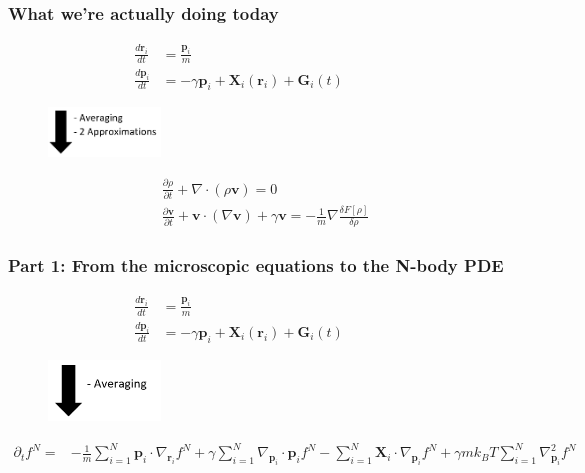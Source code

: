 \documentclass[aspectratio=169,xcolor=dvipsnames]{beamer}
\begin{document}
\begin{frame}
	\frametitle{What we're actually doing today}
	
	\begin{align*}
	\frac{d \mathbf{r}_i}{dt} &= \frac{\mathbf{p}_i}{m}\\
	\frac{d \mathbf{p}_i}{dt} &= - \gamma \mathbf{p}_i + \mathbf{X}_i(\mathbf{r}_i) + \mathbf{G}_i(t) \qquad \quad
	\end{align*}
	\vspace{-0.5cm}
	\begin{figure}
		\includegraphics[width=3cm]{Arrow.png}
	\end{figure}
    \vspace{-0.3cm}
	\begin{align*}
	&\frac{\partial \rho}{\partial t} + \nabla \cdot \left(\rho \mathbf{v}\right) = 0 \\
	&\frac{\partial \mathbf{v}}{\partial t} + \mathbf{v} \cdot \left(\nabla \mathbf{v}\right) + \gamma \mathbf{v} = - \frac{1}{m}  \nabla \frac{\delta {F}[\rho]}{\delta \rho}
	\end{align*}
	
\end{frame}
\begin{frame}
	\frametitle{Part 1: From the microscopic equations to the N-body PDE}
	
	\begin{align*}
	\frac{d \mathbf{r}_i}{dt} &= \frac{\mathbf{p}_i}{m}\\
	\frac{d \mathbf{p}_i}{dt} &= - \gamma \mathbf{p}_i + \mathbf{X}_i(\mathbf{r}_i) + \mathbf{G}_i(t) \qquad \quad
	\end{align*}
	\vspace{-0.5cm}
	\begin{figure}
		\includegraphics[width=3cm]{Arrow2.png}
	\end{figure}
	\vspace{-0.3cm}
	\begin{align*}
	\partial_t f^N = &- \frac{1}{m} \sum_{i=1}^N \mathbf{p}_i \cdot \nabla_{\mathbf{r}_i} f^N + \gamma \sum_{i = 1}^N \nabla_{\mathbf{p}_i}
	\cdot \mathbf{p}_i f^N - \sum_{i=1}^N \mathbf{X}_i \cdot \nabla_{\mathbf{p}_i}f^N + \gamma m k_BT \sum_{i=1}^N \nabla^2_{\mathbf{p}_i}f^N	
	\end{align*}

\end{frame}
\end{document}

